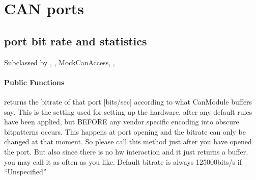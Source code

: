 \documentclass[a4paper,10pt,english]{sphinxmanual}
\begin{document}
\chapter{CAN ports}
\label{\detokenize{canports:can-ports}}\label{\detokenize{canports::doc}}

\section{port bit rate and statistics}
\label{\detokenize{canports:port-bit-rate-and-statistics}}

\begin{fulllineitems}
\label{\detokenize{canports:_CPPv4N9CanModule10CCanAccessE}}%
\pysigstartmultiline
{}%
\pysigstopmultiline
Subclassed by {\hyperref[\detokenize{classestracing:classAnaCanScan}]{}}, {\hyperref[\detokenize{classestracing:classCSockCanScan}]{}}, MockCanAccess, {\hyperref[\detokenize{vendors/peak:classPKCanScan}]{}}, {\hyperref[\detokenize{classestracing:classSTCanScan}]{}}
\subsubsection*{Public Functions}

\begin{fulllineitems}
\label{\detokenize{canports:_CPPv4N9CanModule10CCanAccess14getPortBitrateEv}}%
\pysigstartmultiline
{}%
\pysigstopmultiline
returns the bitrate of that port {[}bits/sec{]} according to what CanModule buffers say. This is the setting used for setting up the hardware, after any default rules have been applied, but BEFORE any vendor specific encoding into obscure bitpatterns occurs. This happens at port opening and the bitrate can only be changed at that moment. So please call this method just after you have opened the port. But also since there is no hw interaction and it just returns a buffer, you may call it as often as you like. Default bitrate is always 125000bits/s if “Unspecified” 

\end{fulllineitems}


\end{fulllineitems}
\end{document}
